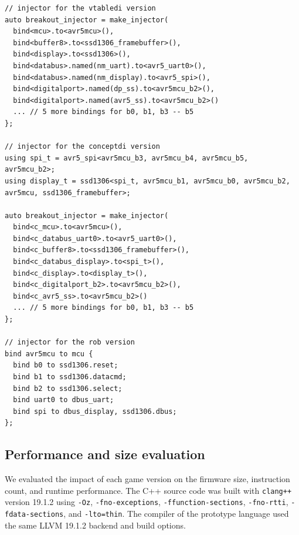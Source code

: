 \documentclass[sigconf]{acmart}
\begin{document}
\begin{lstlisting}[float=tp, caption=Injectors for each DI-enabled version of breakout game., label=lst:cppbindings, showlines=true]
// injector for the vtabledi version
auto breakout_injector = make_injector(
  bind<mcu>.to<avr5mcu>(),
  bind<buffer8>.to<ssd1306_framebuffer>(),
  bind<display>.to<ssd1306>(),
  bind<databus>.named(nm_uart).to<avr5_uart0>(),
  bind<databus>.named(nm_display).to<avr5_spi>(),
  bind<digitalport>.named(dp_ss).to<avr5mcu_b2>(),
  bind<digitalport>.named(avr5_ss).to<avr5mcu_b2>()
  ... // 5 more bindings for b0, b1, b3 -- b5
};

// injector for the conceptdi version
using spi_t = avr5_spi<avr5mcu_b3, avr5mcu_b4, avr5mcu_b5, avr5mcu_b2>;
using display_t = ssd1306<spi_t, avr5mcu_b1, avr5mcu_b0, avr5mcu_b2, avr5mcu, ssd1306_framebuffer>;

auto breakout_injector = make_injector(
  bind<c_mcu>.to<avr5mcu>(),
  bind<c_databus_uart0>.to<avr5_uart0>(),
  bind<c_buffer8>.to<ssd1306_framebuffer>(),
  bind<c_databus_display>.to<spi_t>(),
  bind<c_display>.to<display_t>(),
  bind<c_digitalport_b2>.to<avr5mcu_b2>(),
  bind<c_avr5_ss>.to<avr5mcu_b2>()
  ... // 5 more bindings for b0, b1, b3 -- b5
};

// injector for the rob version
bind avr5mcu to mcu {
  bind b0 to ssd1306.reset;
  bind b1 to ssd1306.datacmd;
  bind b2 to ssd1306.select;
  bind uart0 to dbus_uart;
  bind spi to dbus_display, ssd1306.dbus;
};

\end{lstlisting}



\subsection{Performance and size evaluation} \label{sec:performance}

We evaluated the impact of each game version on the firmware size, instruction count, and runtime performance. The C++ source code was built with {\tt clang++} version 19.1.2 using {\tt -Oz}, {\tt -fno-exceptions}, {\tt -ffunction-sections}, {\tt -fno-rtti}, {\tt -fdata-sections}, and {\tt -lto=thin}. The compiler of the prototype language used the same LLVM 19.1.2 backend and build options. 
\end{document}
